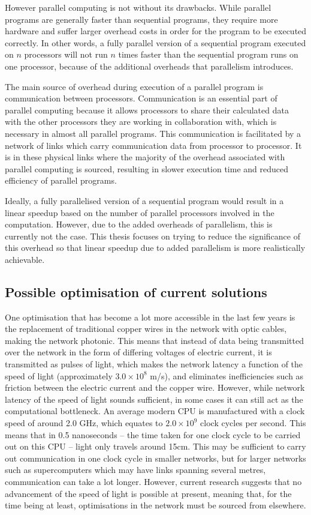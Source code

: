 \documentclass[a4paper, 12pt]{article}
\begin{document}
However parallel computing is not without its drawbacks. While parallel programs are generally faster than sequential programs, they require more hardware and suffer larger overhead costs in order for the program to be executed correctly. In other words, a fully parallel version of a sequential program executed on $n$ processors will not run $n$ times faster than the sequential program runs on one processor, because of the additional overheads that parallelism introduces.

The main source of overhead during execution of a parallel program is communication between processors. Communication is an essential part of parallel computing because it allows processors to share their calculated data with the other processors they are working in collaboration with, which is necessary in almost all parallel programs. This communication is facilitated by a network of links which carry communication data from processor to processor. It is in these physical links where the majority of the overhead associated with parallel computing is sourced, resulting in slower execution time and reduced efficiency of parallel programs.

Ideally, a fully parallelised version of a sequential program would result in a linear speedup based on the number of parallel processors involved in the computation. However, due to the added overheads of parallelism, this is currently not the case. This thesis focuses on trying to reduce the significance of this overhead so that linear speedup due to added parallelism is more realistically achievable.

\subsection{Possible optimisation of current solutions}
\label{sec:possible_optimisations}

One optimisation that has become a lot more accessible in the last few years is the replacement of traditional copper wires in the network with optic cables, making the network photonic. This means that instead of data being transmitted over the network in the form of differing voltages of electric current, it is transmitted as pulses of light, which makes the network latency a function of the speed of light (approximately $3.0 \times 10^8 $ m/s), and eliminates inefficiencies such as friction between the electric current and the copper wire. However, while network latency of the speed of light sounds sufficient, in some cases it can still act as the computational bottleneck. An average modern CPU is manufactured with a clock speed of around 2.0 GHz, which equates to $2.0 \times 10^9$ clock cycles per second. This means that in 0.5 nanoseconds -- the time taken for one clock cycle to be carried out on this CPU -- light only travels around 15cm. This may be sufficient to carry out communication in one clock cycle in smaller networks, but for larger networks such as supercomputers which may have links spanning several metres, communication can take a lot longer. However, current research suggests that no advancement of the speed of light is possible at present, meaning that, for the time being at least, optimisations in the network must be sourced from elsewhere. 
\end{document}
